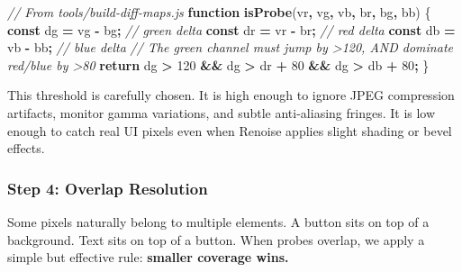 \documentclass[
  11pt,
  oneside]{report}
\newenvironment{Shaded}{\begin{snugshade}}{\end{snugshade}}
\newcommand{\CommentTok}[1]{\textcolor[rgb]{0.56,0.35,0.01}{\textit{#1}}}
\newcommand{\ControlFlowTok}[1]{\textcolor[rgb]{0.13,0.29,0.53}{\textbf{#1}}}
\newcommand{\DecValTok}[1]{\textcolor[rgb]{0.00,0.00,0.81}{#1}}
\newcommand{\FunctionTok}[1]{\textcolor[rgb]{0.13,0.29,0.53}{\textbf{#1}}}
\newcommand{\KeywordTok}[1]{\textcolor[rgb]{0.13,0.29,0.53}{\textbf{#1}}}
\newcommand{\NormalTok}[1]{#1}
\newcommand{\OperatorTok}[1]{\textcolor[rgb]{0.81,0.36,0.00}{\textbf{#1}}}
\begin{document}
\begin{Shaded}
\begin{Highlighting}[]
\CommentTok{// From tools/build{-}diff{-}maps.js}
\KeywordTok{function} \FunctionTok{isProbe}\NormalTok{(vr}\OperatorTok{,}\NormalTok{ vg}\OperatorTok{,}\NormalTok{ vb}\OperatorTok{,}\NormalTok{ br}\OperatorTok{,}\NormalTok{ bg}\OperatorTok{,}\NormalTok{ bb) \{}
  \KeywordTok{const}\NormalTok{ dg }\OperatorTok{=}\NormalTok{ vg }\OperatorTok{{-}}\NormalTok{ bg}\OperatorTok{;}   \CommentTok{// green delta}
  \KeywordTok{const}\NormalTok{ dr }\OperatorTok{=}\NormalTok{ vr }\OperatorTok{{-}}\NormalTok{ br}\OperatorTok{;}   \CommentTok{// red delta}
  \KeywordTok{const}\NormalTok{ db }\OperatorTok{=}\NormalTok{ vb }\OperatorTok{{-}}\NormalTok{ bb}\OperatorTok{;}   \CommentTok{// blue delta}
  \CommentTok{// The green channel must jump by \textgreater{}120, AND dominate red/blue by \textgreater{}80}
  \ControlFlowTok{return}\NormalTok{ dg }\OperatorTok{\textgreater{}} \DecValTok{120} \OperatorTok{\&\&}\NormalTok{ dg }\OperatorTok{\textgreater{}}\NormalTok{ dr }\OperatorTok{+} \DecValTok{80} \OperatorTok{\&\&}\NormalTok{ dg }\OperatorTok{\textgreater{}}\NormalTok{ db }\OperatorTok{+} \DecValTok{80}\OperatorTok{;}
\NormalTok{\}}
\end{Highlighting}
\end{Shaded}

This threshold is carefully chosen. It is high enough to ignore JPEG
compression artifacts, monitor gamma variations, and subtle
anti-aliasing fringes. It is low enough to catch real UI pixels even
when Renoise applies slight shading or bevel effects.

\subsubsection{Step 4: Overlap
Resolution}\label{step-4-overlap-resolution}

Some pixels naturally belong to multiple elements. A button sits on top
of a background. Text sits on top of a button. When probes overlap, we
apply a simple but effective rule: \textbf{smaller coverage wins.}
\end{document}
